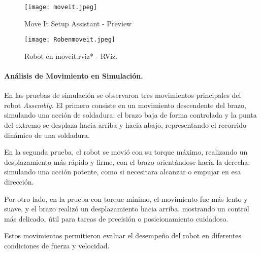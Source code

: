 \begin{figure}[H] 
	\centering
	\texttt{[image: moveit.jpeg]}
	\caption{Move It Setup Assistant - Preview}
	\label{fig:moveit}
\end{figure}

\begin{figure}[H] 
	\centering
	\texttt{[image: Robenmoveit.jpeg]}
	\caption{Robot en moveit.rviz* - RViz.}
	\label{fig:Robrviz}
\end{figure}
\paragraph{Análisis de Movimiento en Simulación.}

En las pruebas de simulación se observaron tres movimientos principales del robot \textit{Assembly}. El primero consiste en un movimiento descendente del brazo, simulando una acción de soldadura: el brazo baja de forma controlada y la punta del extremo se desplaza hacia arriba y hacia abajo, representando el recorrido dinámico de una soldadura.

En la segunda prueba, el robot se movió con su torque máximo, realizando un desplazamiento más rápido y firme, con el brazo orientándose hacia la derecha, simulando una acción potente, como si necesitara alcanzar o empujar en esa dirección.

Por otro lado, en la prueba con torque mínimo, el movimiento fue más lento y suave, y el brazo realizó un desplazamiento hacia arriba, mostrando un control más delicado, útil para tareas de precisión o posicionamiento cuidadoso.

Estos movimientos permitieron evaluar el desempeño del robot en diferentes condiciones de fuerza y velocidad.
